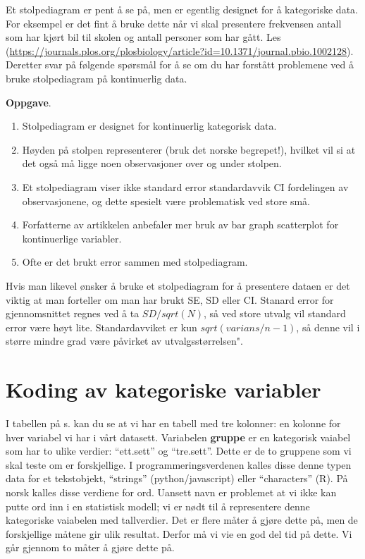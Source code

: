 \documentclass[
]{book}
\begin{document}
Et stolpediagram er pent å se på, men er egentlig designet for å kategoriske data. For eksempel er det fint å bruke dette når vi skal presentere frekvensen antall som har kjørt bil til skolen og antall personer som har gått. Les \citep{weissgerber_beyond_2015}(\url{https://journals.plos.org/plosbiology/article?id=10.1371/journal.pbio.1002128}). Deretter svar på følgende spørsmål for å se om du har forstått problemene ved å bruke stolpediagram på kontinuerlig data.

\textbf{Oppgave}.

\begin{enumerate}
\def\labelenumi{\alph{enumi}.}
\item
  Stolpediagram er designet for kontinuerlig kategorisk data.
\item
  Høyden på stolpen representerer (bruk det norske begrepet!), hvilket vil si at det også må ligge noen observasjoner over og under stolpen.
\item
  Et stolpediagram viser ikke standard error standardavvik CI fordelingen av observasjonene, og dette spesielt være problematisk ved store små.
\item
  Forfatterne av artikkelen anbefaler mer bruk av bar graph scatterplot for kontinuerlige variabler.
\item
  Ofte er det brukt error sammen med stolpediagram.
\end{enumerate}

Hvis man likevel ønsker å bruke et stolpediagram for å presentere dataen er det viktig at man forteller om man har brukt SE, SD eller CI. Stanard error for gjennomsnittet regnes ved å ta \(SD/sqrt(N)\), så ved store utvalg vil standard error være høyt lite. Standardavviket er kun \(sqrt(varians/n-1)\), så denne vil i større mindre grad være påvirket av utvalgsstørrelsen".

\hypertarget{koding-av-kategoriske-variabler}{%
\chapter{Koding av kategoriske variabler}\label{koding-av-kategoriske-variabler}}

I tabellen på s. kan du se at vi har en tabell med tre kolonner: en kolonne for hver variabel vi har i vårt datasett. Variabelen \textbf{gruppe} er en kategorisk vaiabel som har to ulike verdier: ``ett.sett'' og ``tre.sett''. Dette er de to gruppene som vi skal teste om er forskjellige. I programmeringsverdenen kalles disse denne typen data for et tekstobjekt, ``strings'' (python/javascript) eller ``characters'' (R). På norsk kalles disse verdiene for ord. Uansett navn er problemet at vi ikke kan putte ord inn i en statistisk modell; vi er nødt til å representere denne kategoriske vaiabelen med tallverdier. Det er flere måter å gjøre dette på, men de forskjellige måtene gir ulik resultat. Derfor må vi vie en god del tid på dette. Vi går gjennom to måter å gjøre dette på.
\end{document}
